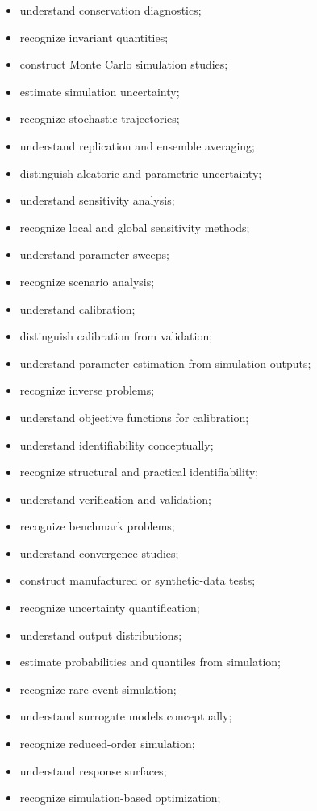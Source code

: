 {\begin{itemize}
    \item understand conservation diagnostics;
    \item recognize invariant quantities;
    \item construct Monte Carlo simulation studies;
    \item estimate simulation uncertainty;
    \item recognize stochastic trajectories;
    \item understand replication and ensemble averaging;
    \item distinguish aleatoric and parametric uncertainty;
    \item understand sensitivity analysis;
    \item recognize local and global sensitivity methods;
    \item understand parameter sweeps;
    \item recognize scenario analysis;
    \item understand calibration;
    \item distinguish calibration from validation;
    \item understand parameter estimation from simulation outputs;
    \item recognize inverse problems;
    \item understand objective functions for calibration;
    \item understand identifiability conceptually;
    \item recognize structural and practical identifiability;
    \item understand verification and validation;
    \item recognize benchmark problems;
    \item understand convergence studies;
    \item construct manufactured or synthetic-data tests;
    \item recognize uncertainty quantification;
    \item understand output distributions;
    \item estimate probabilities and quantiles from simulation;
    \item recognize rare-event simulation;
    \item understand surrogate models conceptually;
    \item recognize reduced-order simulation;
    \item understand response surfaces;
    \item recognize simulation-based optimization;

\end{itemize}}
